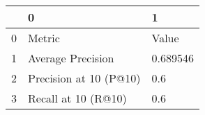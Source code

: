 \begin{tabular}{lll}
\toprule
{} &                       0 &         1 \\
\midrule
0 &                  Metric &     Value \\
1 &       Average Precision &  0.689546 \\
2 &  Precision at 10 (P@10) &       0.6 \\
3 &     Recall at 10 (R@10) &       0.6 \\
\bottomrule
\end{tabular}
